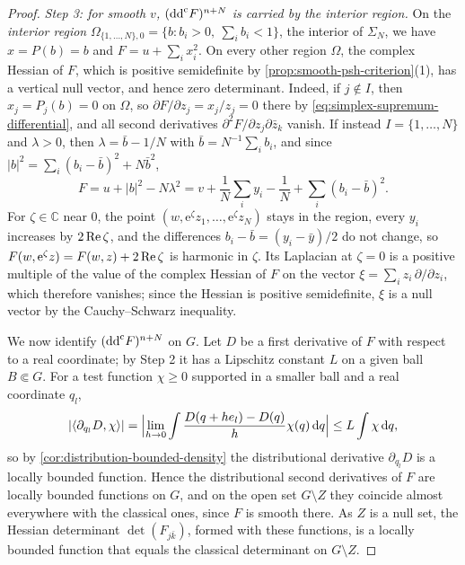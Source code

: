 \begin{proof}
\emph{Step 3: for smooth $v$, $(\mathrm{dd}^{\mathrm{c}} F)^{n+N}$ is carried by the interior region.} On the \emph{interior region} $\Omega_{\{1,\ldots,N\},0}=\{b:b_i>0,\ \sum_ib_i<1\}$, the interior of $\Sigma_N$, we have $x=P(b)=b$ and $F=u+\sum_ix_i^2$. On every other region $\Omega$, the complex Hessian of $F$, which is positive semidefinite by \cref{prop:smooth-psh-criterion}(1), has a vertical null vector, and hence zero determinant. Indeed, if $j\notin I$, then $x_j=P_j(b)=0$ on $\Omega$, so $\partial F/\partial z_j=x_j/z_j=0$ there by \eqref{eq:simplex-supremum-differential}, and all second derivatives $\partial^2F/\partial z_j\partial\bar z_k$ vanish. If instead $I=\{1,\ldots,N\}$ and $\lambda>0$, then $\lambda=\bar b-1/N$ with $\bar b=N^{-1}\sum_ib_i$, and since $|b|^2=\sum_i(b_i-\bar b)^2+N\bar b^2$,
\[
 F=u+|b|^2-N\lambda^2=v+\frac1N\sum_iy_i-\frac1N+\sum_i(b_i-\bar b)^2.
\]
For $\zeta\in\mathbb C$ near $0$, the point $(w,\mathrm e^\zeta z_1,\ldots,\mathrm e^\zeta z_N)$ stays in the region, every $y_i$ increases by $2\operatorname{Re}\zeta$, and the differences $b_i-\bar b=(y_i-\bar y)/2$ do not change, so $F(w,\mathrm e^\zeta z)=F(w,z)+2\operatorname{Re}\zeta$ is harmonic in $\zeta$. Its Laplacian at $\zeta=0$ is a positive multiple of the value of the complex Hessian of $F$ on the vector $\xi=\sum_iz_i\,\partial/\partial z_i$, which therefore vanishes; since the Hessian is positive semidefinite, $\xi$ is a null vector by the Cauchy--Schwarz inequality.

We now identify $(\mathrm{dd}^{\mathrm{c}} F)^{n+N}$ on $G$. Let $D$ be a first derivative of $F$ with respect to a real coordinate; by Step 2 it has a Lipschitz constant $L$ on a given ball $B\Subset G$. For a test function $\chi\geq0$ supported in a smaller ball and a real coordinate $q_l$,
\[
 |\langle\partial_{q_l}D,\chi\rangle|=\Bigl|\lim_{h\to0}\int\frac{D(q+he_l)-D(q)}{h}\chi(q)\,\mathrm dq\Bigr|\leq L\int\chi\,\mathrm dq,
\]
so by \cref{cor:distribution-bounded-density} the distributional derivative $\partial_{q_l}D$ is a locally bounded function. Hence the distributional second derivatives of $F$ are locally bounded functions on $G$, and on the open set $G\setminus Z$ they coincide almost everywhere with the classical ones, since $F$ is smooth there. As $Z$ is a null set, the Hessian determinant $\det(F_{j\bar k})$, formed with these functions, is a locally bounded function that equals the classical determinant on $G\setminus Z$.


\end{proof}
